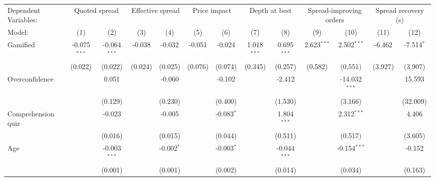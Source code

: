 \begin{tabular}{lcccccccccccc}
   \tabularnewline \midrule \midrule
   Dependent Variables: & \multicolumn{2}{c}{Quoted spread} & \multicolumn{2}{c}{Effective spread} & \multicolumn{2}{c}{Price impact} & \multicolumn{2}{c}{Depth at best} & \multicolumn{2}{c}{Spread-improving orders} & \multicolumn{2}{c}{Spread recovery (s)}\\
   Model:              & (1)            & (2)            & (3)           & (4)           & (5)          & (6)          & (7)           & (8)            & (9)           & (10)            & (11)           & (12)\\  
   \midrule
   Gamified            & -0.075$^{***}$ & -0.064$^{***}$ & -0.038        & -0.032        & -0.051       & -0.024       & 1.018$^{***}$ & 0.695$^{***}$  & 2.623$^{***}$ & 2.502$^{***}$   & -6.462         & -7.514$^{*}$\\   
                       & (0.022)        & (0.022)        & (0.024)       & (0.025)       & (0.076)      & (0.074)      & (0.345)       & (0.257)        & (0.582)       & (0.551)         & (3.927)        & (3.907)\\   
   Overconfidence      &                & 0.051          &               & -0.060        &              & -0.102       &               & -2.412         &               & -14.032$^{***}$ &                & 15.593\\   
                       &                & (0.129)        &               & (0.230)       &              & (0.400)      &               & (1.530)        &               & (3.166)         &                & (32.009)\\   
   Comprehension quiz  &                & -0.023         &               & -0.005        &              & -0.083$^{*}$ &               & 1.804$^{***}$  &               & 2.312$^{***}$   &                & 4.406\\   
                       &                & (0.016)        &               & (0.015)       &              & (0.044)      &               & (0.511)        &               & (0.517)         &                & (3.605)\\   
   Age                 &                & -0.003$^{***}$ &               & -0.002$^{*}$  &              & -0.003$^{*}$ &               & -0.044$^{***}$ &               & -0.154$^{***}$  &                & -0.152\\   
                       &                & (0.001)        &               & (0.001)       &              & (0.002)      &               & (0.014)        &               & (0.034)         &                & (0.163)\\   

\end{tabular}
